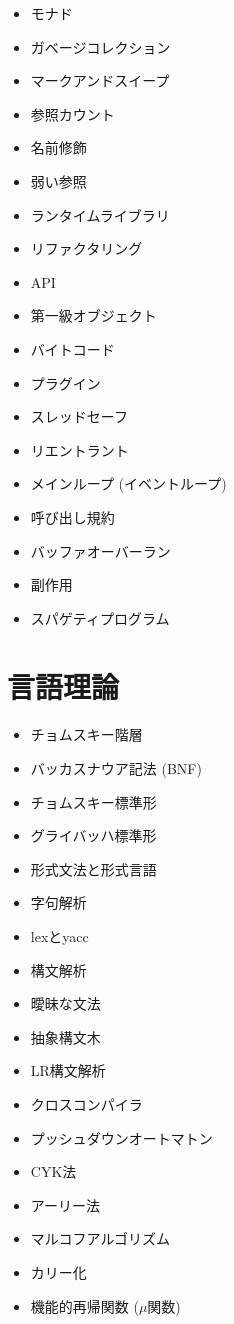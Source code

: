 \documentclass[a4j, titlepage, 11pt]{jsarticle}
\begin{document}
\begin{multicols}{2}
\begin{itemize}
	\item モナド
	\item ガベージコレクション
	\item マークアンドスイープ
	\item 参照カウント
	\item 名前修飾
	\item 弱い参照
	\item ランタイムライブラリ
	\item リファクタリング
	\item API
	\item 第一級オブジェクト
	\item バイトコード
	\item プラグイン
	\item スレッドセーフ
	\item リエントラント
	\item メインループ (イベントループ)
	\item 呼び出し規約
	\item バッファオーバーラン
	\item 副作用
	\item スパゲティプログラム
\end{itemize}
\end{multicols}

\section{言語理論}
\begin{multicols}{2}
\begin{itemize}
	\item チョムスキー階層
	\item バッカスナウア記法 (BNF)
	\item チョムスキー標準形
	\item グライバッハ標準形
	\item 形式文法と形式言語
	\item 字句解析
	\item lexとyacc
	\item 構文解析
	\item 曖昧な文法
	\item 抽象構文木
	\item LR構文解析
	\item クロスコンパイラ
	\item プッシュダウンオートマトン
	\item CYK法
	\item アーリー法
	\item マルコフアルゴリズム
	\item カリー化
	\item 機能的再帰関数 ($\mu$関数)
\end{itemize}
\end{multicols}
\end{document}
